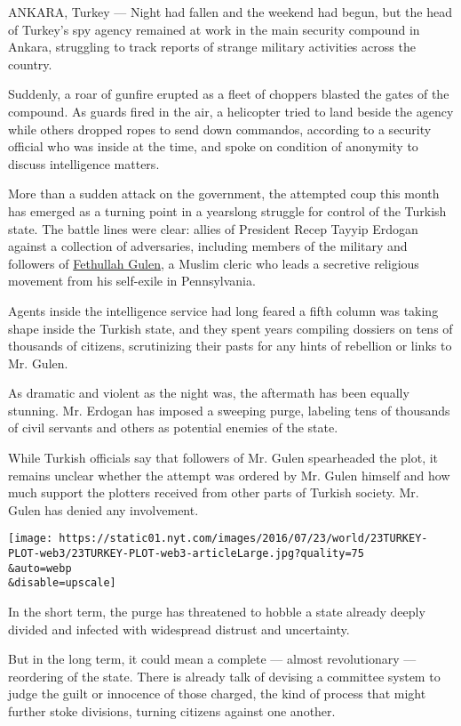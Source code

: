 ANKARA, Turkey --- Night had fallen and the weekend had begun, but the
head of Turkey's spy agency remained at work in the main security
compound in Ankara, struggling to track reports of strange military
activities across the country.

Suddenly, a roar of gunfire erupted as a fleet of choppers blasted the
gates of the compound. As guards fired in the air, a helicopter tried to
land beside the agency while others dropped ropes to send down
commandos, according to a security official who was inside at the time,
and spoke on condition of anonymity to discuss intelligence matters.

More than a sudden attack on the government, the attempted coup this
month has emerged as a turning point in a yearslong struggle for control
of the Turkish state. The battle lines were clear: allies of President
Recep Tayyip Erdogan against a collection of adversaries, including
members of the military and followers of
\href{https://www.nytimes.com/2016/07/20/world/europe/fethullah-gulen-erdogan-extradition.html}{Fethullah
Gulen}, a Muslim cleric who leads a secretive religious movement from
his self-exile in Pennsylvania.

Agents inside the intelligence service had long feared a fifth column
was taking shape inside the Turkish state, and they spent years
compiling dossiers on tens of thousands of citizens, scrutinizing their
pasts for any hints of rebellion or links to Mr. Gulen.

As dramatic and violent as the night was, the aftermath has been equally
stunning. Mr. Erdogan has imposed a sweeping purge, labeling tens of
thousands of civil servants and others as potential enemies of the
state.

While Turkish officials say that followers of Mr. Gulen spearheaded the
plot, it remains unclear whether the attempt was ordered by Mr. Gulen
himself and how much support the plotters received from other parts of
Turkish society. Mr. Gulen has denied any involvement.

\texttt{[image: https://static01.nyt.com/images/2016/07/23/world/23TURKEY-PLOT-web3/23TURKEY-PLOT-web3-articleLarge.jpg?quality=75\\\&auto=webp\\\&disable=upscale]}

In the short term, the purge has threatened to hobble a state already
deeply divided and infected with widespread distrust and uncertainty.

But in the long term, it could mean a complete --- almost revolutionary
--- reordering of the state. There is already talk of devising a
committee system to judge the guilt or innocence of those charged, the
kind of process that might further stoke divisions, turning citizens
against one another.

